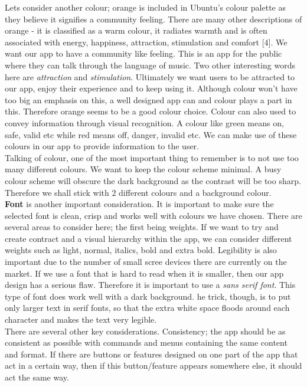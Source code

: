 Lets consider another colour; orange is included in Ubuntu's colour palette as they believe it signifies a community feeling.  There are many other descriptions of orange - it is classified as a warm colour, it radiates warmth and is often associated with energy, happiness, attraction, stimulation and comfort [4].  We want our app to have a community like feeling.  This is an app for the public where they can talk through the language of music.  Two other interesting words here are \emph{attraction} and \emph{stimulation}.  Ultimately we want users to be attracted to our app, enjoy their experience and to keep using it.  Although colour won't have too big an emphasis on this, a well designed app can and colour plays a part in this.  Therefore orange seems to be a good colour choice.  
Colour can also used to convey information through visual recognition.  A colour like green means on, safe, valid etc while red means off, danger, invalid etc.  We can make use of these colours in our app to provide information to the user.  \\
Talking of colour, one of the most important thing to remember is to not use too many different colours.  We want to keep the colour scheme minimal.  A busy colour scheme will obscure the dark background as the contrast will be too sharp.  Therefore we shall stick with 2 different colours and a background colour.  \\

\textbf{Font} is another important consideration.  It is important to make sure the selected font is clean, crisp and works well with colours we have chosen.  There are several areas to consider here; the first being weights.  If we want to try and create contract and a visual hierarchy within the app, we can consider different weights such as light, normal, italics, bold and extra bold.  Legibility is also important due to the number of small scree devices there are currently on the market.  If we use a font that is hard to read when it is smaller, then our app design has a serious flaw.  Therefore it is important to use a \emph{sans serif font}.  This type of font does work well with a dark background.  
he trick, though, is to put only larger text in serif fonts, so that the extra white space floods around each character and makes the text very legible.  \\

There are several other key considerations.  Consistency; the app should be as consistent as possible with commands and menus containing the same content and format.  If there are buttons or features designed on one part of the app that act in a certain way, then if this button/feature appears somewhere else, it should act the same way.  




